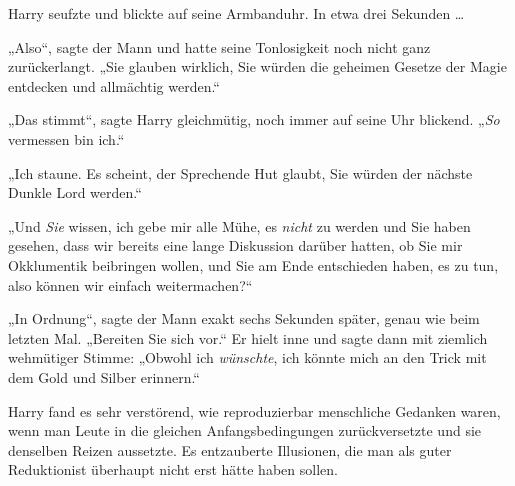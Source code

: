 Harry seufzte und blickte auf seine Armbanduhr. In etwa drei Sekunden …

„Also“, sagte der Mann und hatte seine Tonlosigkeit noch nicht ganz zurückerlangt.
„Sie glauben wirklich, Sie würden die geheimen Gesetze der Magie entdecken und allmächtig werden.“

„Das stimmt“, sagte Harry gleichmütig, noch immer auf seine Uhr blickend.
„\emph{So} vermessen bin ich.“

„Ich staune. Es scheint, der Sprechende Hut glaubt, Sie würden der nächste Dunkle Lord werden.“

„Und \emph{Sie} wissen, ich gebe mir alle Mühe, es \emph{nicht} zu werden und Sie haben gesehen, dass wir bereits eine lange Diskussion darüber hatten, ob Sie mir Okklumentik beibringen wollen, und Sie am Ende entschieden haben, es zu tun, also können wir einfach weitermachen?“

„In Ordnung“, sagte der Mann exakt sechs Sekunden später, genau wie beim letzten Mal.
„Bereiten Sie sich vor.“ Er hielt inne und sagte dann mit ziemlich wehmütiger Stimme:
„Obwohl ich \emph{wünschte}, ich könnte mich an den Trick mit dem Gold und Silber erinnern.“

Harry fand es sehr verstörend, wie reproduzierbar menschliche Gedanken waren, wenn man Leute in die gleichen Anfangsbedingungen zurückversetzte und sie denselben Reizen aussetzte. Es entzauberte Illusionen, die man als guter Reduktionist überhaupt nicht erst hätte haben sollen.

